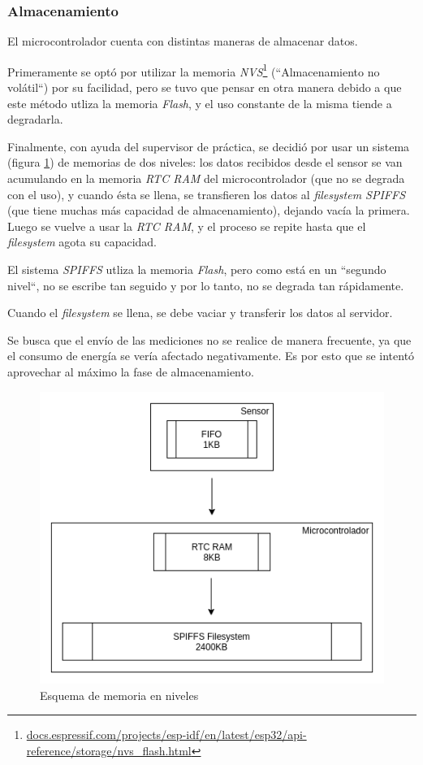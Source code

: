 \documentclass{article}
\newcommand{ \fnnvs }{\footnote{\url{docs.espressif.com/projects/esp-idf/en/latest/esp32/api-reference/storage/nvs_flash.html}}}
\begin{document}
    \subsubsection{Almacenamiento}
    El microcontrolador cuenta con distintas maneras de almacenar datos. \par
    Primeramente se optó por utilizar la memoria \emph{NVS}\fnnvs 
    (``Almacenamiento no volátil``) por su facilidad, pero se tuvo que pensar 
    en otra manera debido a que este método utliza la memoria \emph{Flash}, y 
    el uso constante de la misma tiende a degradarla. \par
    Finalmente, con ayuda del supervisor de práctica, se decidió por usar un 
    sistema (figura \ref{fig:memoria}) de memorias de dos niveles: los datos 
    recibidos desde el sensor se van acumulando en la memoria \emph{RTC RAM} 
    del microcontrolador (que no se degrada con el uso), y cuando ésta se 
    llena, se transfieren los datos al \emph{filesystem SPIFFS} (que tiene 
    muchas más capacidad de almacenamiento), dejando vacía la primera. 
    Luego se vuelve a usar la \emph{RTC RAM}, y el proceso se repite hasta 
    que el \emph{filesystem} agota su capacidad. \par
    El sistema \emph{SPIFFS} utliza la memoria \emph{Flash}, pero como está
    en un ``segundo nivel``, no se escribe tan seguido y por lo tanto, no 
    se degrada tan rápidamente. \par
    Cuando el \emph{filesystem} se llena, se debe vaciar y transferir los
    datos al servidor. \par
    Se busca que el envío de las mediciones no se realice de manera frecuente, 
    ya que el consumo de energía se vería afectado negativamente. Es por esto
    que se intentó aprovechar al máximo la fase de almacenamiento.

    \begin{figure}[h]
        \includegraphics[width=0.8 \textwidth, center]{esquema_memoria.png}
        \caption{Esquema de memoria en niveles}
        \label{fig:memoria}
    \end{figure}
\end{document}

